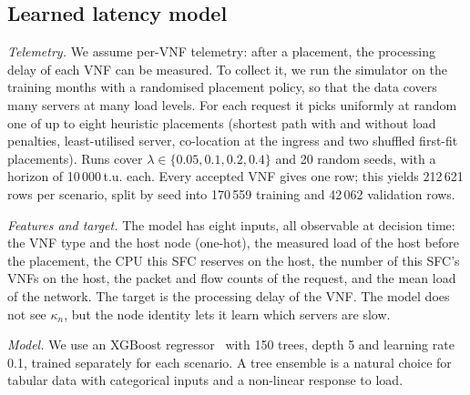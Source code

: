 \documentclass[conference,a4paper]{IEEEtran}
\begin{document}
\subsection{Learned latency model}
\emph{Telemetry.} We assume per-VNF telemetry: after a placement, the processing delay of each VNF can be measured.
To collect it, we run the simulator on the training months with a randomised placement policy, so that the data
covers many servers at many load levels. For each request it picks uniformly at random one of up to eight heuristic
placements (shortest path with and without load penalties, least-utilised server, co-location at the ingress and
two shuffled first-fit placements). Runs cover $\lambda \in \{0.05, 0.1, 0.2, 0.4\}$ and 20 random seeds, with a
horizon of 10\,000\,t.u. each. Every accepted VNF gives one row; this yields 212\,621 rows per scenario, split by
seed into 170\,559 training and 42\,062 validation rows.

\emph{Features and target.} The model has eight inputs, all observable at decision time: the VNF type and the
host node (one-hot), the measured load of the host before the placement, the CPU this SFC reserves on the host, the
number of this SFC's VNFs on the host, the packet and flow counts of the request, and the mean load of the network.
The target is the processing delay of the VNF. The model does not see $\kappa_n$, but the node identity lets it learn
which servers are slow.

\emph{Model.} We use an XGBoost regressor~\cite{chen2016xgboost} with 150 trees, depth 5 and learning rate 0.1,
trained separately for each scenario. A tree ensemble is a natural choice for tabular data with categorical inputs
and a non-linear response to load.
\end{document}
